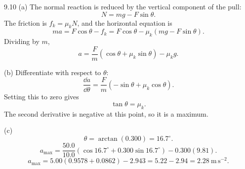 \begin{tabletworkspace}[6.5cm]
\end{tabletworkspace}

\begin{solution}{9.10}
(a) The normal reaction is reduced by the vertical component of the pull:
\[
N=mg-F\sin\theta.
\]
The friction is $f_k=\mu_kN$, and the horizontal equation is
\[
ma=F\cos\theta-f_k=F\cos\theta-\mu_k(mg-F\sin\theta).
\]
Dividing by $m$,
\[
a=\frac Fm(\cos\theta+\mu_k\sin\theta)-\mu_kg.
\]

(b) Differentiate with respect to $\theta$:
\[
\frac{\dd a}{\dd\theta}=\frac Fm(-\sin\theta+\mu_k\cos\theta).
\]
Setting this to zero gives
\[
\tan\theta=\mu_k.
\]
The second derivative is negative at this point, so it is a maximum.

(c)
\[
\theta=\arctan(0.300)=16.7^\circ.
\]
\[
a_{\max}=\frac{50.0}{10.0}\left(\cos16.7^\circ+0.300\sin16.7^\circ\right)
-0.300(9.81).
\]
\[
a_{\max}=5.00(0.9578+0.0862)-2.943=5.22-2.94=2.28\ \mathrm{m\,s^{-2}}.
\]
\end{solution}

